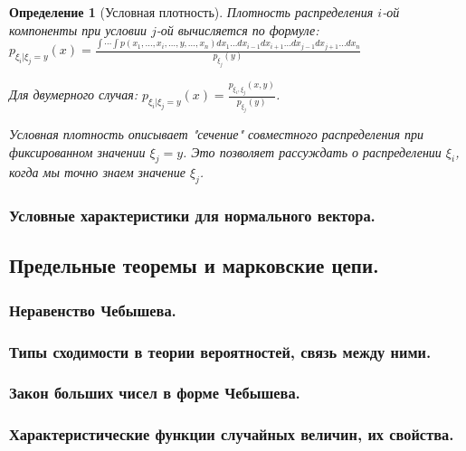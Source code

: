 \documentclass[14pt]{extarticle}
\theoremstyle{breakstyle}
\newtheorem{definition}{Определение}[subsection]
\begin{document}
\begin{definition}[Условная плотность]

Плотность распределения $i$-ой компоненты при условии $j$-ой вычисляется по формуле:\\
$p_{\xi_i|\xi_j=y}(x) = \frac{\int\cdots\int p(x_1,\ldots,x_i,\ldots,y,\ldots,x_n)dx_1\ldots dx_{i-1}dx_{i+1}\ldots dx_{j-1}dx_{j+1}\ldots dx_n}{p_{\xi_j}(y)}$

\vspace{\baselineskip}

Для двумерного случая: $p_{\xi_i|\xi_j=y}(x) = \frac{p_{\xi_i,\xi_j}(x,y)}{p_{\xi_j}(y)}$.

\vspace{\baselineskip}

Условная плотность описывает "сечение" совместного распределения при фиксированном значении $\xi_{j} = y$. Это позволяет рассуждать о распределении $\xi_{i}$, когда мы точно знаем значение $\xi_{j}$.

\end{definition}

\subsubsection{Условные характеристики для нормального вектора.}


\subsection{Предельные теоремы и марковские цепи.}

\subsubsection{Неравенство Чебышева.}

\subsubsection{Типы сходимости в теории вероятностей, связь между ними.}

\subsubsection{Закон больших чисел в форме Чебышева.}

\subsubsection{Характеристические функции случайных величин, их свойства.}
\end{document}
